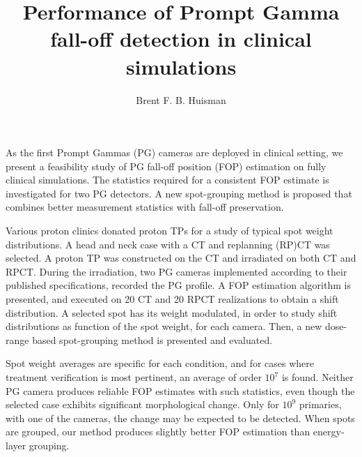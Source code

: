 \documentclass[11pt]{article}
\title{\textbf{Performance of Prompt Gamma fall-off detection in clinical simulations}}
\author{Brent F. B. Huisman}
\date{}
\begin{document}
\maketitle


As the first Prompt Gammas (PG) cameras are deployed in clinical setting, we present a feasibility study of PG fall-off position (FOP) estimation on fully clinical simulations. The statistics required for a consistent FOP estimate is investigated for two PG detectors. A new spot-grouping method is proposed that combines better measurement statistics with fall-off preservation.

Various proton clinics donated proton TPs for a study of typical spot weight distributions. A head and neck case with a CT and replanning (RP)CT was selected. A proton TP was constructed on the CT and irradiated on both CT and RPCT. During the irradiation, two PG cameras implemented according to their published specifications, recorded the PG profile. A FOP estimation algorithm is presented, and executed on 20 CT and 20 RPCT realizations to obtain a shift distribution. A selected spot has its weight modulated, in order to study shift distributions as function of the spot weight, for each camera. Then, a new dose-range based spot-grouping method is presented and evaluated.

Spot weight averages are specific for each condition, and for cases where treatment verification is most pertinent, an average of order $10^7$ is found. Neither PG camera produces reliable FOP estimates with such statistics, even though the selected case exhibits significant morphological change. Only for $10^9$ primaries, with one of the cameras, the change may be expected to be detected. When spots are grouped, our method produces slightly better FOP estimation than energy-layer grouping.
\end{document}
